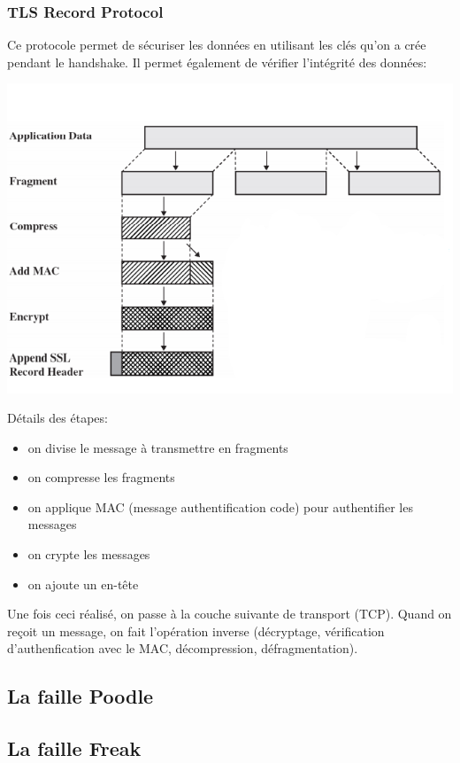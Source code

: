 \subsubsection{TLS Record Protocol}

Ce protocole permet de sécuriser les données en utilisant les clés qu'on a crée pendant le handshake. Il permet également de vérifier l'intégrité des données:
\begin{center}
\includegraphics[scale=0.7]{img/tls-record.png}
\end{center}

Détails des étapes:
\begin{itemize}
\item on divise le message à transmettre en fragments 
\item on compresse les fragments
\item on applique MAC (message authentification code) pour authentifier les messages 
\item on crypte les messages
\item on ajoute un en-t\^ete
\end{itemize}
Une fois ceci réalisé, on passe à la couche suivante de transport (TCP). Quand on reçoit un message, on fait l'opération inverse (décryptage, vérification d'authenfication avec le MAC, décompression, défragmentation).


\subsection{La faille Poodle}

\subsection{La faille Freak}


